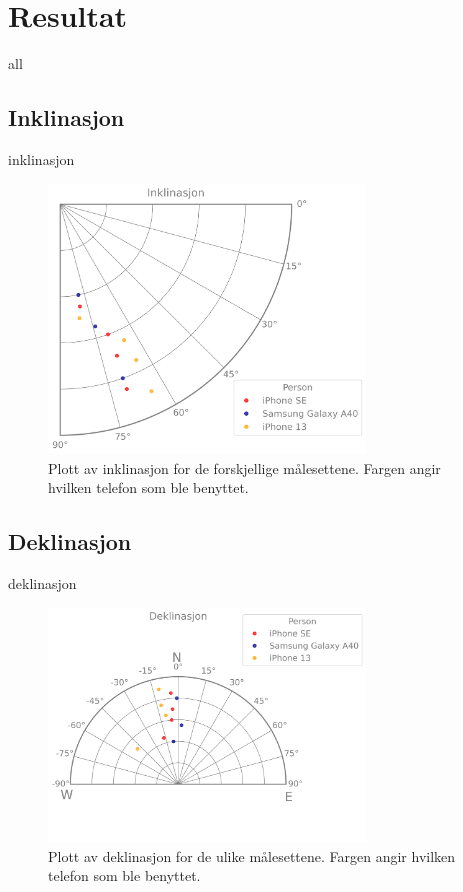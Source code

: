 \section{Resultat}

{all}

\subsection{Inklinasjon}

{inklinasjon}

\begin{figure}
    \centering
    \includegraphics[width=0.75\textwidth]{Plots/inclination.png}
    \caption{Plott av inklinasjon for de forskjellige målesettene. Fargen angir hvilken telefon som ble benyttet.}
    
    \label{fig:plot_inklination}
\end{figure}


\subsection{Deklinasjon}

{deklinasjon}

\begin{figure}
    \centering
    \includegraphics[width=0.75\textwidth]{Plots/declination.png}
    \caption{Plott av deklinasjon for de ulike målesettene. Fargen angir hvilken telefon som ble benyttet.}
    \label{fig:plot_declination}
\end{figure}


